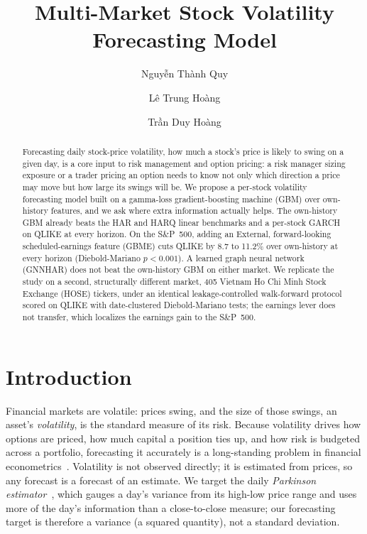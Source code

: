 \documentclass{llncs}
\begin{document}
\title{Multi-Market Stock Volatility Forecasting Model}

\author{Nguyễn Thành Quy \and Lê Trung Hoàng \and Trần Duy Hoàng}

\maketitle

\begin{abstract}
Forecasting daily stock-price volatility, how much a stock's price is likely to swing on a given day,
is a core input to risk management and option pricing: a risk manager sizing exposure or a trader
pricing an option needs to know not only which direction a price may move but how large its swings
will be. We propose a per-stock volatility forecasting model built on a gamma-loss gradient-boosting
machine (GBM) over own-history features, and we ask where extra information actually helps. The
own-history GBM already beats the HAR and HARQ linear benchmarks and a per-stock GARCH on QLIKE at
every horizon. On the S\&P~500, adding an External, forward-looking scheduled-earnings feature (GBME)
cuts QLIKE by 8.7 to 11.2\% over own-history at every horizon (Diebold-Mariano $p<0.001$). A learned
graph neural network (GNNHAR) does not beat the own-history GBM on either market. We replicate the
study on a second, structurally different market, 405 Vietnam Ho Chi Minh Stock Exchange (HOSE)
tickers, under an identical leakage-controlled walk-forward protocol scored on QLIKE with
date-clustered Diebold-Mariano tests; the earnings lever does not transfer, which localizes the
earnings gain to the S\&P~500.
\end{abstract}

\section{Introduction}
Financial markets are volatile: prices swing, and the size of those swings, an asset's
\emph{volatility}, is the standard measure of its risk. Because volatility drives how options are
priced, how much capital a position ties up, and how risk is budgeted across a portfolio, forecasting
it accurately is a long-standing problem in financial econometrics~\cite{corsi2009}. Volatility is
not observed directly; it is estimated from prices, so any forecast is a forecast of an estimate. We
target the daily \emph{Parkinson estimator}~\cite{parkinson1980}, which gauges a day's variance from
its high-low price range and uses more of the day's information than a close-to-close measure; our
forecasting target is therefore a variance (a squared quantity), not a standard deviation.
\end{document}
